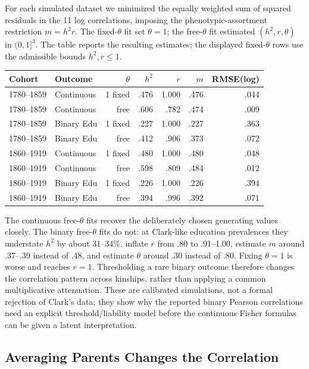 For each simulated dataset we minimized the equally weighted sum of squared
residuals in the 11 log correlations, imposing the phenotypic-assortment
restriction $m=h^2r$. The fixed-$\theta$ fit set $\theta=1$; the free-$\theta$
fit estimated $(h^2,r,\theta)$ in $(0,1]^3$. The table reports the resulting
estimates; the displayed fixed-$\theta$ rows use the admissible bounds
$h^2,r\leq1$.

\begin{center}
\small
\begin{tabular}{llrrrrr}
\hline
Cohort & Outcome & $\theta$ & $h^2$ & $r$ & $m$ & RMSE(log)\\
\hline
1780--1859 & Continuous & 1 fixed & .476 & 1.000 & .476 & .044\\
1780--1859 & Continuous & free & .606 & .782 & .474 & .009\\
1780--1859 & Binary Edu & 1 fixed & .227 & 1.000 & .227 & .363\\
1780--1859 & Binary Edu & free & .412 & .906 & .373 & .072\\
1860--1919 & Continuous & 1 fixed & .480 & 1.000 & .480 & .048\\
1860--1919 & Continuous & free & .598 & .809 & .484 & .012\\
1860--1919 & Binary Edu & 1 fixed & .226 & 1.000 & .226 & .394\\
1860--1919 & Binary Edu & free & .394 & .996 & .392 & .071\\
\hline
\end{tabular}
\end{center}

The continuous free-$\theta$ fits recover the deliberately chosen generating
values closely. The binary free-$\theta$ fits do not: at Clark-like education
prevalences they understate $h^2$ by about 31--34\%, inflate $r$ from .80 to
.91--1.00, estimate $m$ around .37--.39 instead of .48, and estimate
$\theta$ around .30 instead of .80. Fixing $\theta=1$ is worse and reaches
$r=1$. Thresholding a rare binary outcome therefore changes the correlation
pattern across kinships, rather than applying a common multiplicative
attenuation. These are calibrated simulations, not a formal rejection of
Clark's data; they show why the reported binary Pearson correlations need an
explicit threshold/liability model before the continuous Fisher formulas can
be given a latent interpretation.
\subsection{Averaging Parents Changes the Correlation}
\label{sec:me-averages}

